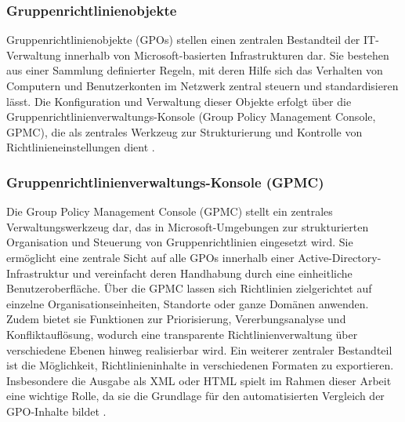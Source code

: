 \subsubsection{Gruppenrichtlinienobjekte}
    Gruppenrichtlinienobjekte (GPOs) stellen einen zentralen Bestandteil der IT-Verwaltung innerhalb von Microsoft-basierten Infrastrukturen dar. Sie bestehen aus einer Sammlung definierter Regeln, mit deren Hilfe sich das Verhalten von Computern und Benutzerkonten im Netzwerk zentral steuern und standardisieren lässt. Die Konfiguration und Verwaltung dieser Objekte erfolgt über die Gruppenrichtlinienverwaltungs-Konsole (Group Policy Management Console, GPMC), die als zentrales Werkzeug zur Strukturierung und Kontrolle von Richtlinieneinstellungen dient \cite{orin-thomas_group_nodate}. 
\subsubsection{Gruppenrichtlinienverwaltungs-Konsole (GPMC)}
    Die Group Policy Management Console (GPMC) stellt ein zentrales Verwaltungswerkzeug dar, das in Microsoft-Umgebungen zur strukturierten Organisation und Steuerung von Gruppenrichtlinien eingesetzt wird. Sie ermöglicht eine zentrale Sicht auf alle GPOs innerhalb einer Active-Directory-Infrastruktur und vereinfacht deren Handhabung durch eine einheitliche Benutzeroberfläche.\newline
    Über die GPMC lassen sich Richtlinien zielgerichtet auf einzelne Organisationseinheiten, Standorte oder ganze Domänen anwenden. Zudem bietet sie Funktionen zur Priorisierung, Vererbungsanalyse und Konfliktauflösung, wodurch eine transparente Richtlinienverwaltung über verschiedene Ebenen hinweg realisierbar wird.
    Ein weiterer zentraler Bestandteil ist die Möglichkeit, Richtlinieninhalte in verschiedenen Formaten zu exportieren. Insbesondere die Ausgabe als XML oder HTML spielt im Rahmen dieser Arbeit eine wichtige Rolle, da sie die Grundlage für den automatisierten Vergleich der GPO-Inhalte bildet \cite{orin-thomas_group_nodate-1}. 
